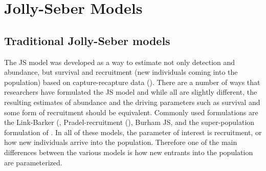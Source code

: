 \section{Jolly-Seber Models}

\subsection{Traditional Jolly-Seber models}

The JS model was developed as a way to estimate not only detection and
abundance, but survival and recruitment (new individuals coming into
the population) based on capture-recapture data (\cite{jolly:1965,
  seber:1965}).  There are a number of ways that researchers have
formulated the JS model \citep{cooch_white:2006} 
and while all are slightly different, the
resulting estimates of abundance and the driving parameters such as
survival and some form of recruitment should be equivalent. 
Commonly used formulations are the Link-Barker
(\citep{link_barker:2005}, Pradel-recruitment (\citep{pradel:1996}),
Burham JS, and the super-population formulation of
 \citet{schwarz_arnason:1996}.    
In all of these
models, the parameter of interest is recruitment, or how new
individuals arrive into the population.  Therefore one of the main
differences between the various models is how new entrants into the
population are parameterized.



